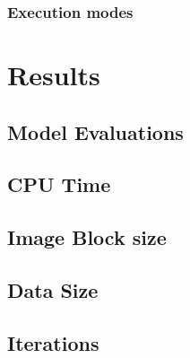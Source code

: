 \documentclass{IEEEtran}
\begin{document}

\subsubsection{Execution modes} %






\section{Results} %


\subsection{Model Evaluations}

\subsection{CPU Time}

\subsection{Image Block size}

\subsection{Data Size}

\subsection{Iterations}
\end{document}

